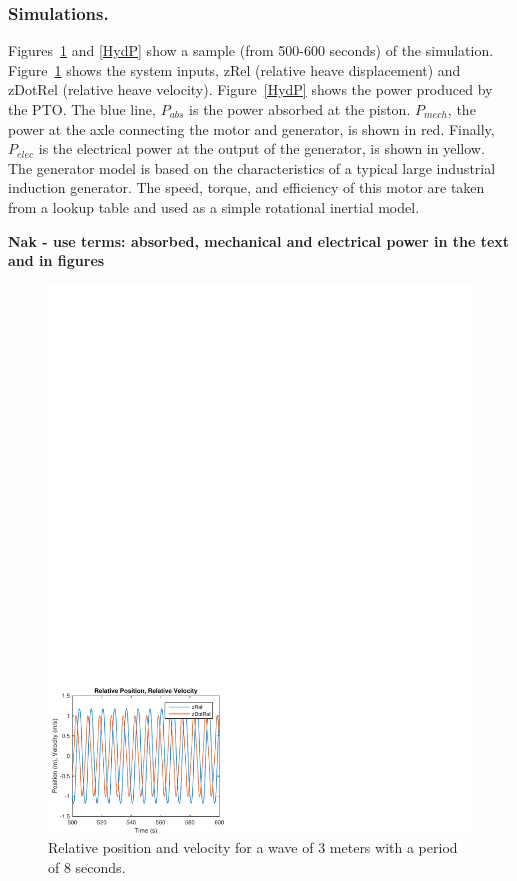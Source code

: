 \documentclass[twocolumn,10pt]{asme2e}
\begin{document}
\subsubsection*{Simulations.}

Figures~\ref{HydZdot} and \ref{HydP} show a sample (from 500-600 seconds) of the simulation. Figure~\ref{HydZdot} shows the system inputs, zRel (relative heave displacement) and zDotRel (relative heave velocity). Figure~\ref{HydP} shows the power produced by the PTO. The blue line, $P_{abs}$ is the power absorbed at the piston. $P_{mech}$, the power at the axle connecting the motor and generator, is shown in red. Finally, $P_{elec}$ is the electrical power at the output of the generator, is shown in yellow. The generator model is based on the characteristics of a typical large industrial induction generator. The speed, torque, and efficiency of this motor are taken from a lookup table and used as a simple rotational inertial model. 

\textbf{Nak - use terms: absorbed, mechanical and electrical power in the text and in figures}

\begin{figure}[t]
    \centering
    \includegraphics[width=1\columnwidth]{Images/zRelzDotRel} %
    \caption{Relative position and velocity for a wave of 3 meters with a period of 8 seconds.}
    \label{HydZdot}
    \end{figure}
\end{document}
